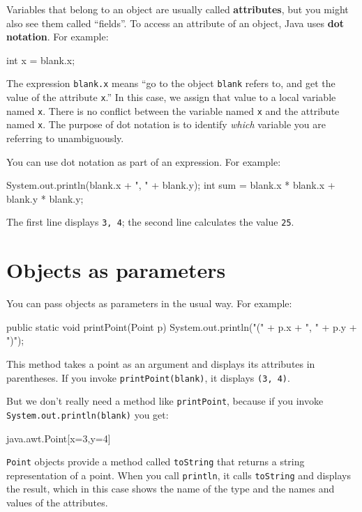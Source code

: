 \documentclass[12pt]{book}
\theoremstyle{exercise}
\newcommand{\java}[1]{\verb"#1"}
\begin{document}

Variables that belong to an object are usually called {\bf attributes}, but you might also see them called ``fields''.
To access an attribute of an object, Java uses {\bf dot notation}.
For example:

\begin{code}
    int x = blank.x;
\end{code}

The expression \java{blank.x} means ``go to the object \java{blank} refers to, and get the value of the attribute \java{x}.''
In this case, we assign that value to a local variable named \java{x}.
There is no conflict between the variable named \java{x} and the attribute named \java{x}.
The purpose of dot notation is to identify {\em which} variable you are referring to unambiguously.

You can use dot notation as part of an expression.
For example:

\begin{code}
    System.out.println(blank.x + ", " + blank.y);
    int sum = blank.x * blank.x + blank.y * blank.y;
\end{code}

The first line displays \java{3, 4}; the second line calculates the value \java{25}.


\section{Objects as parameters}


You can pass objects as parameters in the usual way.
For example:

\begin{code}
    public static void printPoint(Point p) {
        System.out.println("(" + p.x + ", " + p.y + ")");
    }
\end{code}

This method takes a point as an argument and displays its attributes in parentheses.
If you invoke \java{printPoint(blank)}, it displays \java{(3, 4)}.

But we don't really need a method like \java{printPoint}, because if you invoke \java{System.out.println(blank)} you get:

\begin{stdout}
java.awt.Point[x=3,y=4]
\end{stdout}

\java{Point} objects provide a method called \java{toString} that returns a string representation of a point.
When you call \java{println}, it calls {\tt toString} and displays the result, which in this case shows the name of the type and the names and values of the attributes.
\end{document}
